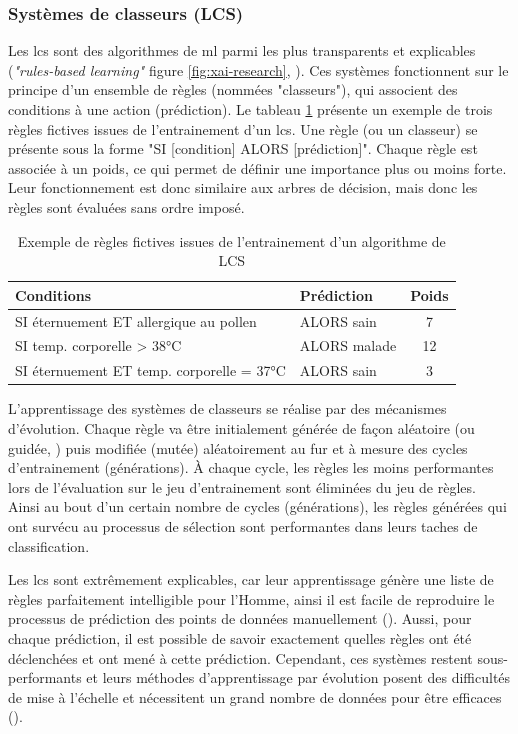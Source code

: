 \subsubsection{Systèmes de classeurs (LCS)}
Les \gls{lcs} sont des algorithmes de \gls{ml} parmi les plus transparents et explicables (\textit{"rules-based learning"} figure \ref{fig:xai-research}, \cite{arrieta_explainable_2019}). Ces systèmes fonctionnent sur le principe d'un ensemble de règles (nommées "classeurs"), qui associent des conditions à une action (prédiction). Le tableau \ref{table:lcs-rules} présente un exemple de trois règles fictives issues de l'entrainement d'un \gls{lcs}. Une règle (ou un classeur) se présente sous la forme "SI [condition] ALORS [prédiction]". Chaque règle est associée à un poids, ce qui permet de définir une importance plus ou moins forte. Leur fonctionnement est donc similaire aux arbres de décision, mais donc les règles sont évaluées sans ordre imposé.
\begin{table}[!ht]
\centering
\begin{tabular}{|l|l|c|} 
 \hline
 Conditions & Prédiction & Poids \\
 \hline
 SI éternuement ET allergique au pollen & ALORS sain & 7 \\ 
 SI temp. corporelle > 38°C & ALORS malade & 12  \\ 
 SI éternuement ET temp. corporelle = 37°C & ALORS sain & 3  \\ 

 \hline
\end{tabular}
\caption{Exemple de règles fictives issues de l'entrainement d'un algorithme de LCS}
\label{table:lcs-rules}
\end{table}

L'apprentissage des systèmes de classeurs se réalise par des mécanismes d'évolution. Chaque règle va être initialement générée de façon aléatoire (ou guidée, \cite{urbanowicz_relief-based_2018}) puis modifiée (mutée) aléatoirement au fur et à mesure des cycles d'entrainement (générations). À chaque cycle, les règles les moins performantes lors de l'évaluation sur le jeu d'entrainement sont éliminées du jeu de règles. Ainsi au bout d'un certain nombre de cycles (générations), les règles générées qui ont survécu au processus de sélection sont performantes dans leurs taches de classification.

Les \gls{lcs} sont extrêmement explicables, car leur apprentissage génère une liste de règles parfaitement intelligible pour l'Homme, ainsi il est facile de reproduire le processus de prédiction des points de données manuellement (\cite{arrieta_explainable_2019}). Aussi, pour chaque prédiction, il est possible de savoir exactement quelles règles ont été déclenchées et ont mené à cette prédiction. Cependant, ces systèmes restent sous-performants et leurs méthodes d'apprentissage par évolution posent des difficultés de mise à l'échelle et nécessitent un grand nombre de données pour être efficaces (\cite{urbanowicz_exstracs_2015}).

